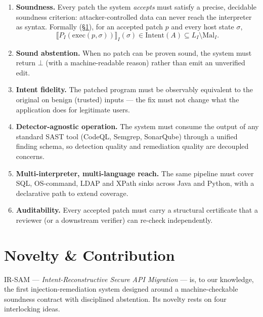 \documentclass[11pt,a4paper]{article}
\newcommand{\bottom}{\ensuremath{\bot}}
\newcommand{\irsam}{\mbox{IR\nobreakdash-SAM}}
\begin{document}
\begin{enumerate}[label=\textbf{R\arabic*.},leftmargin=2.6em]
  \item \textbf{Soundness.} Every patch the system \emph{accepts} must
  satisfy a precise, decidable soundness criterion: attacker-controlled
  data can never reach the interpreter as syntax. Formally
  (\S\ref{sec:novelty}), for an accepted patch $p$ and every host state
  $\sigma$,
  \[
    \llbracket P_I(\mathrm{exec}(p,\sigma))\rrbracket_I(\sigma)
       \in \mathrm{Intent}(A) \subseteq L_I \setminus \mathrm{Mal}_I .
  \]
  \item \textbf{Sound abstention.} When no patch can be proven sound, the
  system must return \bottom{} (with a machine-readable reason) rather
  than emit an unverified edit.
  \item \textbf{Intent fidelity.} The patched program must be observably
  equivalent to the original on benign (trusted) inputs --- the fix must
  not change what the application does for legitimate users.
  \item \textbf{Detector-agnostic operation.} The system must consume the
  output of any standard SAST tool (CodeQL, Semgrep, SonarQube) through a
  unified finding schema, so detection quality and remediation quality are
  decoupled concerns.
  \item \textbf{Multi-interpreter, multi-language reach.} The same
  pipeline must cover SQL, OS-command, LDAP and XPath sinks across Java and
  Python, with a declarative path to extend coverage.
  \item \textbf{Auditability.} Every accepted patch must carry a
  structural certificate that a reviewer (or a downstream verifier) can
  re-check independently.
\end{enumerate}

\section{Novelty \& Contribution}
\label{sec:novelty}

\irsam{} --- \emph{Intent-Reconstructive Secure API Migration} --- is, to
our knowledge, the first injection-remediation system designed around a
machine-checkable soundness contract with disciplined abstention. Its
novelty rests on four interlocking ideas.
\end{document}
